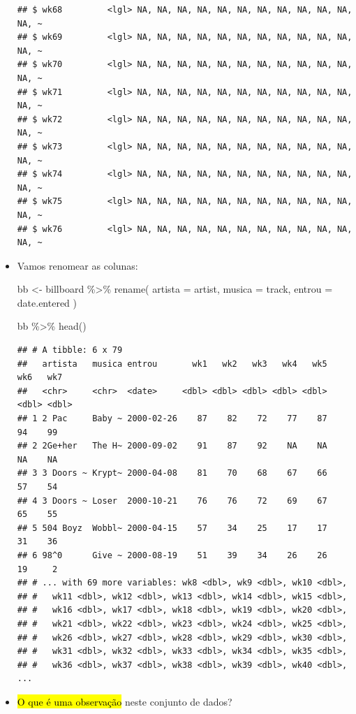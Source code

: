 \documentclass[
  11pt]{report}
\newenvironment{Shaded}{\begin{snugshade}}{\end{snugshade}}
\newcommand{\AttributeTok}[1]{\textcolor[rgb]{0.77,0.63,0.00}{#1}}
\newcommand{\FunctionTok}[1]{\textcolor[rgb]{0.00,0.00,0.00}{#1}}
\newcommand{\NormalTok}[1]{#1}
\newcommand{\OtherTok}[1]{\textcolor[rgb]{0.56,0.35,0.01}{#1}}
\newcommand{\SpecialCharTok}[1]{\textcolor[rgb]{0.00,0.00,0.00}{#1}}
\renewenvironment{Shaded}{
    \begin{mdframed}[%
      roundcorner=2pt,%
      innerleftmargin=5pt,%
      innerrightmargin=5pt,%
      topline=true,%
      leftline=true,%
      rightline=true,%
      bottomline=true,%
      linewidth=0.5pt,%
      linecolor=black!20,%
      backgroundcolor=black!2,%
      skipabove=2ex,%
      skipbelow=2.5ex%
    ]%
  }
  {
    \end{mdframed}
  }
\begin{document}
\begin{itemize}
\begin{verbatim}
## $ wk68         <lgl> NA, NA, NA, NA, NA, NA, NA, NA, NA, NA, NA, NA, ~
## $ wk69         <lgl> NA, NA, NA, NA, NA, NA, NA, NA, NA, NA, NA, NA, ~
## $ wk70         <lgl> NA, NA, NA, NA, NA, NA, NA, NA, NA, NA, NA, NA, ~
## $ wk71         <lgl> NA, NA, NA, NA, NA, NA, NA, NA, NA, NA, NA, NA, ~
## $ wk72         <lgl> NA, NA, NA, NA, NA, NA, NA, NA, NA, NA, NA, NA, ~
## $ wk73         <lgl> NA, NA, NA, NA, NA, NA, NA, NA, NA, NA, NA, NA, ~
## $ wk74         <lgl> NA, NA, NA, NA, NA, NA, NA, NA, NA, NA, NA, NA, ~
## $ wk75         <lgl> NA, NA, NA, NA, NA, NA, NA, NA, NA, NA, NA, NA, ~
## $ wk76         <lgl> NA, NA, NA, NA, NA, NA, NA, NA, NA, NA, NA, NA, ~
\end{verbatim}
\item
  Vamos renomear as colunas:

\begin{Shaded}
\begin{Highlighting}[]
\NormalTok{bb }\OtherTok{\textless{}{-}}\NormalTok{ billboard }\SpecialCharTok{\%\textgreater{}\%} 
  \FunctionTok{rename}\NormalTok{(}
    \AttributeTok{artista =}\NormalTok{ artist,}
    \AttributeTok{musica =}\NormalTok{ track,}
    \AttributeTok{entrou =}\NormalTok{ date.entered}
\NormalTok{  )}
\end{Highlighting}
\end{Shaded}

\begin{Shaded}
\begin{Highlighting}[]
\NormalTok{bb }\SpecialCharTok{\%\textgreater{}\%} \FunctionTok{head}\NormalTok{()}
\end{Highlighting}
\end{Shaded}

\begin{verbatim}
## # A tibble: 6 x 79
##   artista   musica entrou       wk1   wk2   wk3   wk4   wk5   wk6   wk7
##   <chr>     <chr>  <date>     <dbl> <dbl> <dbl> <dbl> <dbl> <dbl> <dbl>
## 1 2 Pac     Baby ~ 2000-02-26    87    82    72    77    87    94    99
## 2 2Ge+her   The H~ 2000-09-02    91    87    92    NA    NA    NA    NA
## 3 3 Doors ~ Krypt~ 2000-04-08    81    70    68    67    66    57    54
## 4 3 Doors ~ Loser  2000-10-21    76    76    72    69    67    65    55
## 5 504 Boyz  Wobbl~ 2000-04-15    57    34    25    17    17    31    36
## 6 98^0      Give ~ 2000-08-19    51    39    34    26    26    19     2
## # ... with 69 more variables: wk8 <dbl>, wk9 <dbl>, wk10 <dbl>,
## #   wk11 <dbl>, wk12 <dbl>, wk13 <dbl>, wk14 <dbl>, wk15 <dbl>,
## #   wk16 <dbl>, wk17 <dbl>, wk18 <dbl>, wk19 <dbl>, wk20 <dbl>,
## #   wk21 <dbl>, wk22 <dbl>, wk23 <dbl>, wk24 <dbl>, wk25 <dbl>,
## #   wk26 <dbl>, wk27 <dbl>, wk28 <dbl>, wk29 <dbl>, wk30 <dbl>,
## #   wk31 <dbl>, wk32 <dbl>, wk33 <dbl>, wk34 <dbl>, wk35 <dbl>,
## #   wk36 <dbl>, wk37 <dbl>, wk38 <dbl>, wk39 <dbl>, wk40 <dbl>, ...
\end{verbatim}
\item
  {\hl{O que é uma observação}} neste conjunto de dados?


\end{itemize}
\end{document}
